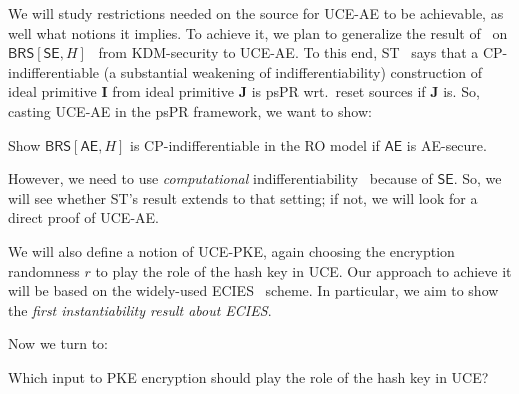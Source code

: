{\begin{itemize}
We will study restrictions needed on the source for UCE-AE to be achievable, as well what notions it implies.
To achieve it, we plan to generalize the result of~\cite{C:BelHoaKee13} on  $\mathsf{BRS}[\mathsf{SE},H]$~\cite{C:BlaRogShr02} from KDM-security to UCE-AE.
To this end, ST~\cite{EC:SonTes17} says that a CP-indifferentiable (a  substantial weakening of indifferentiability)  construction of ideal primitive $\mathbf{I}$ from  ideal primitive $\mathbf{J}$  is psPR   wrt.~reset sources if $\mathbf{J}$ is. So, casting UCE-AE in the psPR framework, we want to show:
\begin{task} \label{task-ro}
    Show  $\mathsf{BRS}[\mathsf{AE}, H]$ is CP-indifferentiable in the RO model if $\mathsf{AE}$ is AE-secure.
\end{task}
However, we  need to use \emph{computational}  indifferentiability~\cite{C:ZhaZha20,AC:ZhaZha23} because of $\mathsf{SE}$. So,  we will see whether ST's result extends to that setting; if not, we will look for a direct proof of UCE-AE.
\fi

 We will also define a notion of UCE-PKE, again choosing the encryption randomness $r$ to play the role of the hash key in UCE.  Our approach to achieve it will be based on the widely-used ECIES~\cite{dhies} scheme.  In particular, we aim to show the \emph{first instantiability result about ECIES}.
\fi

\iffalse
Now we turn to:
\begin{ques}
    Which input to PKE encryption  should play the role of the hash key in UCE?
\end{ques}


\end{itemize}}
